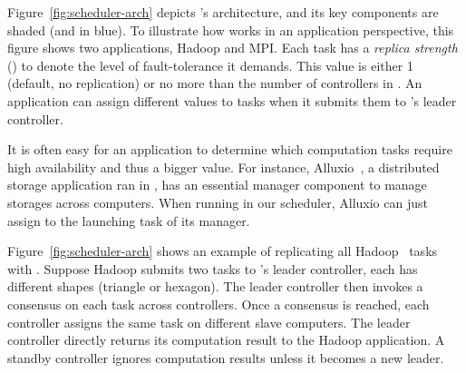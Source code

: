 



Figure~\ref{fig:scheduler-arch} depicts \tripod's architecture, and its key 
components are shaded (and in blue). To illustrate how \tripod works in an 
application perspective, this figure shows two applications, Hadoop and MPI. 
Each task has a \emph{replica strength} () to denote the level of 
fault-tolerance it demands. This  value is either 1 (default, no 
replication) or no more than the number of controllers in \tripod. An 
application can assign different  values to tasks when it submits them 
to \tripod's leader controller.

It is often easy for an application to determine which computation tasks 
require high availability and thus a bigger  value. For instance, 
Alluxio~\cite{alluxio}, a distributed storage application ran in \mesos, has 
an essential manager component to manage storages across computers. When 
running in our \tripod scheduler, Alluxio can just assign  to the 
launching task of its manager.


Figure~\ref{fig:scheduler-arch} shows an example of replicating all 
Hadoop~\cite{hadoop} tasks with . Suppose Hadoop submits two tasks to 
\tripod's leader controller, each has different shapes (triangle or hexagon). 
The leader controller then invokes a consensus on each task across controllers. 
Once a consensus is reached, each controller assigns the same task on different 
slave computers. The leader controller directly returns its computation result 
to the Hadoop application. A standby controller ignores computation results 
unless it becomes a new leader.

